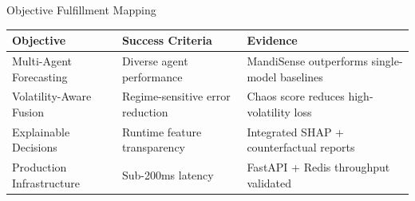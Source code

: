 \documentclass[aspectratio=169,10pt]{beamer}
\newenvironment{herocard}[1][0.98\textwidth]{%
  \begin{center}
  \begin{mdframed}[
    linewidth=0.5pt,
    linecolor=borderLight,
    backgroundcolor=bgCard,
    roundcorner=8pt,
    shadow=true,
    shadowsize=4pt,
    shadowcolor=black!6,
    innertopmargin=8pt,
    innerbottommargin=8pt,
    innerleftmargin=12pt,
    innerrightmargin=12pt
  ]
  \begin{minipage}{#1}
}{%
  \end{minipage}
  \end{mdframed}
  \end{center}
}
\begin{document}
\begin{frame}{Objective Fulfillment Mapping}
\begin{herocard}
\centering
\scriptsize
\begin{tabular}{p{3.2cm}|p{3.4cm}|p{3.4cm}}
\toprule
\bfseries Objective & \bfseries Success Criteria & \bfseries Evidence \\
\midrule
Multi-Agent Forecasting & Diverse agent performance & MandiSense outperforms single-model baselines \\
Volatility-Aware Fusion & Regime-sensitive error reduction & Chaos score reduces high-volatility loss \\
Explainable Decisions & Runtime feature transparency & Integrated SHAP + counterfactual reports \\
Production Infrastructure & Sub-200ms latency & FastAPI + Redis throughput validated \\
\bottomrule
\end{tabular}
\end{herocard}
\end{frame}
\end{document}
